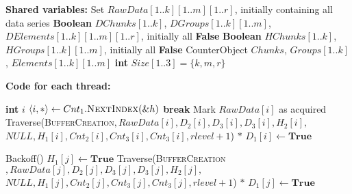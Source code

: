 

\begin{algorithm}[t]
    \footnotesize
    \vspace*{2mm}

    \begin{algorithmic}[1]
    
    \State \textbf{Shared variables:}
    \State Set $\mathit{RawData}[1..k][1..m][1..r]$, initially containing all data series \label{alg:bc:r}
    \State \textbf{Boolean} $\mathit{DChunks}[1..k]$, $\mathit{DGroups}[1..k][1..m]$, $\mathit{DElements}[1..k][1..m][1..r]$, initially all \textbf{False} \label{alg:bc:c}
    \State \textbf{Boolean} $\mathit{HChunks}[1..k]$, $\mathit{HGroups}[1..k][1..m]$, initially all \textbf{False} \label{alg:bc:h}
    \State CounterObject $\mathit{Chunks}$, $\mathit{Groups}[1..k]$, $\mathit{Elements}[1..k][1..m]$ \label{alg:bc:e}
    \State \textbf{int} $\mathit{Size}[1..3] = \{k,m,r\}$

    \vspace*{1mm}
    \State \textbf{Code for each thread:}

        \State \textbf{int} $\mathit{i}$
         \label{alg:bc:while:start}
            \State $\langle i, * \rangle \gets Cnt_1.\mbox{\sc NextIndex}(\&h)$
             \textbf{break} \EndIf
            \State Mark $\mathit{RawData[i]}$ as acquired
                \State Traverse(\textsc{BufferCreation}$\mathit{, RawData[i], D_2[i], D_3[i], D_3[i], H_2[i],}$
                \Statex \quad $\mathit{NULL, H_1[i], Cnt_2[i], Cnt_3[i], Cnt_3[i], rlevel+1}$) \label{alg:bc:recur}
            \Else
                \State $*$
            \EndIf
            \State $\mathit{D_1[i]} \gets \textbf{True}$ \label{alg:bc:c:true}
        \EndWhile

         \label{alg:bc:scan:for}
            \State Backoff()  \label{alg:bc:help:backoff}
             \label{alg:bc:help:if}
                \State $\mathit{H_1[j]} \gets \textbf{True}$ \label{alg:bc:h:true}
                    \State Traverse(\textsc{BufferCreation}$\mathit{, RawData[j], D_2[j], D_3[j], D_3[j], H_2[j],}$
                    \Statex \quad $\mathit{NULL, H_1[j], Cnt_2[j], Cnt_3[j], Cnt_3[j], rlevel+1}$) \label{alg:bc:help:process}
                \Else
                    \State $*$
                \EndIf
                \State $\mathit{D_1[j]} \gets \textbf{True}$ \label{alg:bc:help:c:true}
            \EndIf
        \EndFor
    \EndProcedure


\end{algorithmic}
\end{algorithm}
